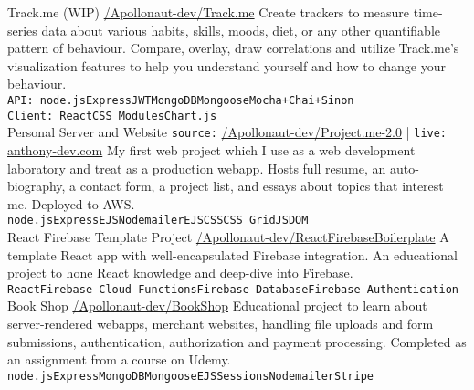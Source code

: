 \documentclass[9pt]{developercv} %
\begin{document}
\begin{entrylist}
  \entryproject
    {Track.me (WIP)}
    {\href{https://github.com/Apollonaut-dev/Track.me}{/Apollonaut-dev/Track.me}}
    {Create trackers to measure time-series data about various habits, skills, moods, diet, or any other quantifiable pattern of behaviour. Compare, overlay, draw correlations and utilize Track.me's visualization features to help you understand yourself and how to change your behaviour.\smallskip \\\texttt{API: }\texttt{node.js}\slashsep\texttt{Express}\slashsep\texttt{JWT}\slashsep\texttt{MongoDB}\slashsep\texttt{Mongoose}\slashsep\texttt{Mocha+Chai+Sinon}\\\texttt{Client: }\texttt{React}\slashsep\texttt{CSS Modules}\slashsep\texttt{Chart.js}}
  \\
  \entryproject
    {Personal Server and Website}
    {\texttt{source:} \href{https://github.com/Apollonaut-dev/Project.me-2.0}{/Apollonaut-dev/Project.me-2.0} | \texttt{live:} \href{http://www.anthony-dev.com}{anthony-dev.com}}
    {My first web project which I use as a web development laboratory and treat as a production webapp. Hosts full resume, an auto-biography, a contact form, a project list, and essays about topics that interest me. Deployed to AWS.\smallskip \\\texttt{node.js}\slashsep\texttt{Express}\slashsep\texttt{EJS}\slashsep\texttt{Nodemailer}\slashsep\texttt{EJS}\slashsep\texttt{CSS}\slashsep\texttt{CSS Grid}\slashsep\texttt{JSDOM}}
  \\
  \entryproject
    {React Firebase Template Project}
    {\href{https://github.com/Apollonaut-dev/ReactFirebaseBoilerplate}{/Apollonaut-dev/ReactFirebaseBoilerplate}}
    {A template React app with well-encapsulated Firebase integration. An educational project to hone React knowledge and deep-dive into Firebase.\\\texttt{React}\slashsep\texttt{Firebase Cloud Functions}\slashsep\texttt{Firebase Database}\slashsep\texttt{Firebase Authentication}}
  \\
  \entryproject
    {Book Shop}
    {\href{https://github.com/Apollonaut-dev/BookShop}{/Apollonaut-dev/BookShop}}
    {Educational project to learn about server-rendered webapps, merchant websites, handling file uploads and form submissions, authentication, authorization and payment processing. Completed as an assignment from a course on Udemy. \smallskip \\\texttt{node.js}\slashsep\texttt{Express}\slashsep\texttt{MongoDB}\slashsep\texttt{Mongoose}\slashsep\texttt{EJS}\slashsep\texttt{Sessions}\slashsep\texttt{Nodemailer}\slashsep\texttt{Stripe}}

\end{entrylist}
\end{document}
